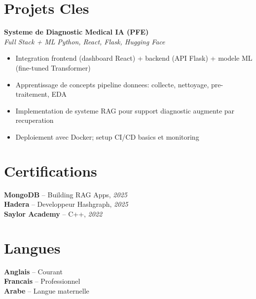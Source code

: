 \documentclass[10pt,a4paper]{article}
\begin{document}
\vspace{4pt}
\section*{Projets Cles}
{\small
\textbf{Systeme de Diagnostic Medical IA (PFE)}\\[1pt]
\textit{Full Stack + ML} \hfill \textit{Python, React, Flask, Hugging Face}
\begin{itemize}
  \item Integration frontend (dashboard React) + backend (API Flask) + modele ML (fine-tuned Transformer)
  \item Apprentissage de concepts pipeline donnees: collecte, nettoyage, pre-traitement, EDA
  \item Implementation de systeme RAG pour support diagnostic augmente par recuperation
  \item Deploiement avec Docker; setup CI/CD basics et monitoring
\end{itemize}
}

\vspace{3pt}
\section*{Certifications}
{\small
\textbf{MongoDB} -- Building RAG Apps, \textit{2025}\\[1pt]
\textbf{Hadera} -- Developpeur Hashgraph, \textit{2025}\\[1pt]
\textbf{Saylor Academy} -- C++, \textit{2022}
}

\section*{Langues}
{\small
\textbf{Anglais} -- Courant\\[1pt]
\textbf{Francais} -- Professionnel\\[1pt]
\textbf{Arabe} -- Langue maternelle
}
\end{document}

